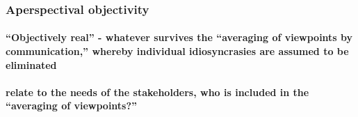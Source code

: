 \documentclass[a4paper]{article}
\begin{document}
\subsubsection{Aperspectival objectivity}

\paragraph{``Objectively real'' - whatever survives the ``averaging of viewpoints
by communication,'' whereby individual idiosyncrasies are assumed to be
eliminated}

\paragraph{relate to the needs of the stakeholders, who is included in the
``averaging of viewpoints?''}




\cleardoublepage


%
%

\end{document}
